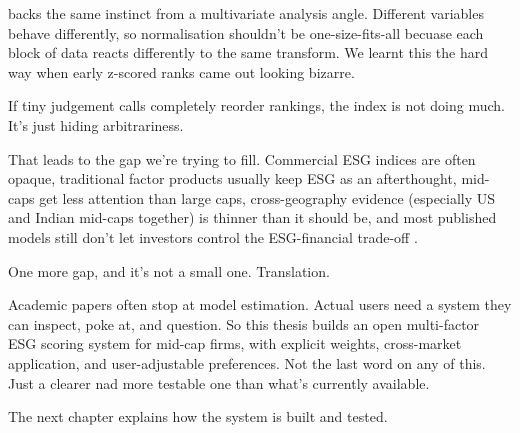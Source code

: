 \textcite{hair_2019} backs the same instinct from a multivariate analysis angle. Different variables behave differently, so normalisation shouldn't be one-size-fits-all becuase each block of data reacts differently to the same transform. We learnt this the hard way when early z-scored ranks came out looking bizarre.

If tiny judgement calls completely reorder rankings, the index is not doing much. It's just hiding arbitrariness.

That leads to the gap we're trying to fill. Commercial ESG indices are often opaque, traditional factor products usually keep ESG as an afterthought, mid-caps get less attention than large caps, cross-geography evidence (especially US and Indian mid-caps together) is thinner than it should be, and most published models still don't let investors control the ESG-financial trade-off \cite{berg_koelbel_rigobon_2022}.

One more gap, and it's not a small one. Translation.

Academic papers often stop at model estimation. Actual users need a system they can inspect, poke at, and question. So this thesis builds an open multi-factor ESG scoring system for mid-cap firms, with explicit weights, cross-market application, and user-adjustable preferences. Not the last word on any of this. Just a clearer nad more testable one than what's currently available.

The next chapter explains how the system is built and tested.
